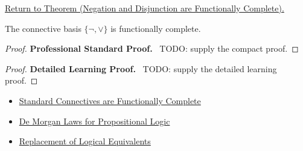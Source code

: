\newpage
{}
\label{prf:negation-disjunction-functionally-complete-propositional-logic}

\begin{remark*}[Return]
\hyperref[thm:negation-disjunction-functionally-complete-propositional-logic]{Return to Theorem (Negation and Disjunction are Functionally Complete).}
\end{remark*}

\begin{theorem*}
The connective basis \(\{\neg,\lor\}\) is functionally complete.
\end{theorem*}

\begin{proof}
\textbf{Professional Standard Proof.}~
TODO: supply the compact proof.
\end{proof}

\begin{proof}
\textbf{Detailed Learning Proof.}~
TODO: supply the detailed learning proof.
\end{proof}

\begin{remark*}
\end{remark*}

\begin{dependencies}
\begin{itemize}
  \item \hyperref[thm:standard-connectives-functionally-complete-propositional-logic]{Standard Connectives are Functionally Complete}
  \item \hyperref[thm:de-morgan-laws-propositional-logic]{De Morgan Laws for Propositional Logic}
  \item \hyperref[thm:replacement-of-logical-equivalents-propositional-logic]{Replacement of Logical Equivalents}
\end{itemize}
\end{dependencies}

\clearpage
